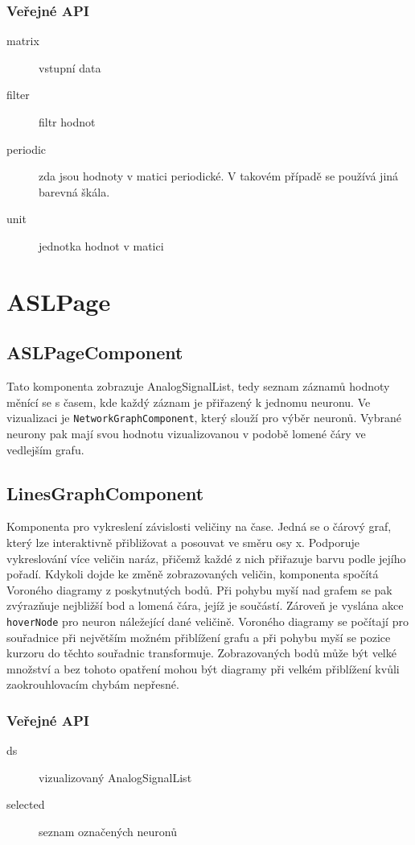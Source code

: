 \subsubsection*{Veřejné API}

\begin{description}
  \item[matrix] vstupní data
  \item[filter] filtr hodnot
  \item[periodic] zda jsou hodnoty v matici periodické. V takovém případě se používá jiná barevná škála.
  \item[unit] jednotka hodnot v matici
\end{description}

\section{ASLPage}

\subsection{ASLPageComponent}

Tato komponenta zobrazuje AnalogSignalList, tedy seznam záznamů hodnoty měnící se s časem, kde každý záznam je přiřazený k jednomu neuronu. Ve vizualizaci je \lstinline|NetworkGraphComponent|, který slouží pro výběr neuronů. Vybrané neurony pak mají svou hodnotu vizualizovanou v podobě lomené čáry ve vedlejším grafu.

\subsection{LinesGraphComponent}

Komponenta pro vykreslení závislosti veličiny na čase. Jedná se o čárový graf, který lze interaktivně přibližovat a posouvat ve směru osy x. Podporuje vykreslování více veličin naráz, přičemž každé z nich přiřazuje barvu podle jejího pořadí. Kdykoli dojde ke změně zobrazovaných veličin, komponenta spočítá Voroného diagramy z poskytnutých bodů. Při pohybu myší nad grafem se pak zvýrazňuje nejbližší bod a lomená čára, jejíž je součástí. Zároveň je vyslána akce \lstinline|hoverNode| pro neuron náležející dané veličině. Voroného diagramy se počítají pro souřadnice při největším možném přiblížení grafu a při pohybu myší se pozice kurzoru do těchto souřadnic transformuje. Zobrazovaných bodů může být velké množství a bez tohoto opatření mohou být diagramy při velkém přiblížení kvůli zaokrouhlovacím chybám nepřesné.

\subsubsection*{Veřejné API}

\begin{description}
  \item[ds] vizualizovaný AnalogSignalList
  \item[selected] seznam označených neuronů
\end{description}
